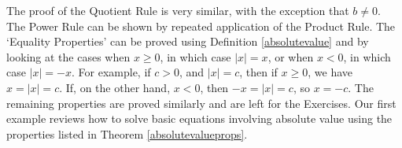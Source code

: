 \medskip

The proof of the Quotient Rule is very similar, with the exception that $b \neq 0$. The Power Rule can be shown by repeated application of the Product Rule.  The `Equality Properties' can be proved using Definition \ref{absolutevalue} and by looking at the cases when $x\geq 0$, in which case $|x| = x$, or when $x<0$, in which case $|x| = -x$.  For example, if $c>0$, and $|x| = c$, then if $x \geq 0$, we have $x = |x| = c$.  If, on the other hand, $x < 0$, then $-x = |x| = c$, so $x = -c$.  The remaining properties are proved similarly and are left for the Exercises.  Our first example reviews how to solve basic equations involving absolute value using the properties listed in Theorem \ref{absolutevalueprops}.

\medskip

